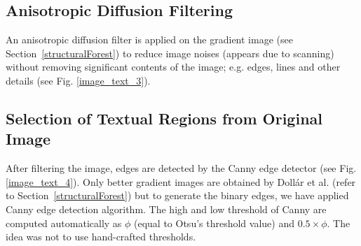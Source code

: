 \documentclass[runningheads]{llncs}
\begin{document}
\subsection {Anisotropic Diffusion Filtering} \label{anisotropicDiff} 
	An anisotropic diffusion \cite{Gerig1992} filter is applied on the gradient image (see Section~\ref{structuralForest}) to reduce image noises (appears due to scanning) without removing significant contents of the image; e.g. edges, lines and other details (see Fig. \ref{image_text_3}). 

\subsection {Selection of Textual Regions from Original Image} \label{textualRegion} After filtering the image, edges are detected by the Canny edge detector (see Fig. \ref{image_text_4}). Only better gradient images are obtained by Dollár et al. \cite{Dollar2013} (refer to Section~\ref{structuralForest}) but to generate the binary edges, we have applied Canny edge detection algorithm.    
The high and low threshold of Canny are computed automatically as $\phi$ (equal to Otsu's threshold value) and $0.5 \times \phi$. The idea was not to use hand-crafted thresholds.
\end{document}
